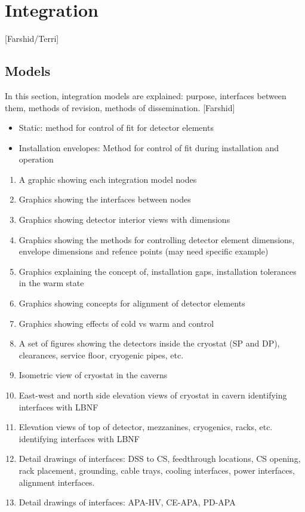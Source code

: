 \chapter{Integration}
\label{vl:tc-integration}

[Farshid/Terri]

\section{Models}

In this section, integration models are explained: purpose, interfaces between them, methods of revision, methods of dissemination. [Farshid]
\begin{itemize}
 \item Static: method for control of fit for detector elements
 \item Installation envelopes: Method for control of fit during installation and operation
\end{itemize}

\begin{enumerate}
 \item A graphic showing each integration model nodes
 \item Graphics showing the interfaces between nodes
 \item Graphics showing detector interior views with dimensions
 \item Graphics showing the methods for controlling detector element dimensions, envelope dimensions and refence points (may need specific example)
 \item Graphics explaining the concept of, installation gaps, installation tolerances in the warm state
 \item Graphics showing concepts for alignment of detector elements
 \item Graphics showing effects of cold vs warm and control
 \item A set of figures showing the detectors inside the cryostat (SP and DP), clearances, service floor, cryogenic pipes, etc.
 \item Isometric view of cryostat in the caverns
 \item East-west and north side elevation views of cryostat in cavern identifying interfaces with LBNF
 \item Elevation views of top of detector, mezzanines, cryogenics, racks, etc. identifying interfaces with LBNF
 \item Detail drawings of interfaces: DSS to CS, feedthrough locations, CS opening, rack placement, grounding, cable trays, cooling interfaces, power interfaces, alignment interfaces.
 \item Detail drawings of interfaces: APA-HV, CE-APA, PD-APA
\end{enumerate}

